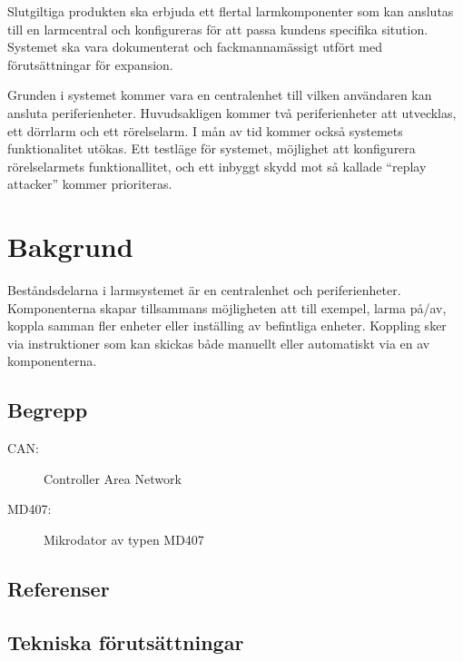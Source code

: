\documentclass[a4paper]{article}
\begin{document}

Slutgiltiga produkten ska erbjuda ett flertal larmkomponenter som kan anslutas till en larmcentral och konfigureras för att passa kundens specifika sitution. Systemet ska vara dokumenterat och fackmannamässigt utfört med förutsättningar för expansion.

Grunden i systemet kommer vara en centralenhet till vilken användaren kan ansluta periferienheter. Huvudsakligen kommer två periferienheter att utvecklas, ett dörrlarm och ett rörelselarm. I mån av tid kommer också systemets funktionalitet utökas. Ett testläge för systemet, möjlighet att konfigurera rörelselarmets funktionallitet, och ett inbyggt skydd mot så kallade ``replay attacker'' kommer prioriteras.


\section{Bakgrund}

Beståndsdelarna i larmsystemet är en centralenhet och periferienheter. Komponenterna skapar tillsammans möjligheten att till exempel, larma på/av, koppla samman fler enheter eller inställing av befintliga enheter. Koppling sker via instruktioner som kan skickas både manuellt eller automatiskt via en av komponenterna.

\subsection{Begrepp}

\begin{description}
    \item[CAN:] Controller Area Network
    \item[MD407:] Mikrodator av typen MD407
\end{description}

\subsection{Referenser}

\subsection{Tekniska förutsättningar}
\end{document}
